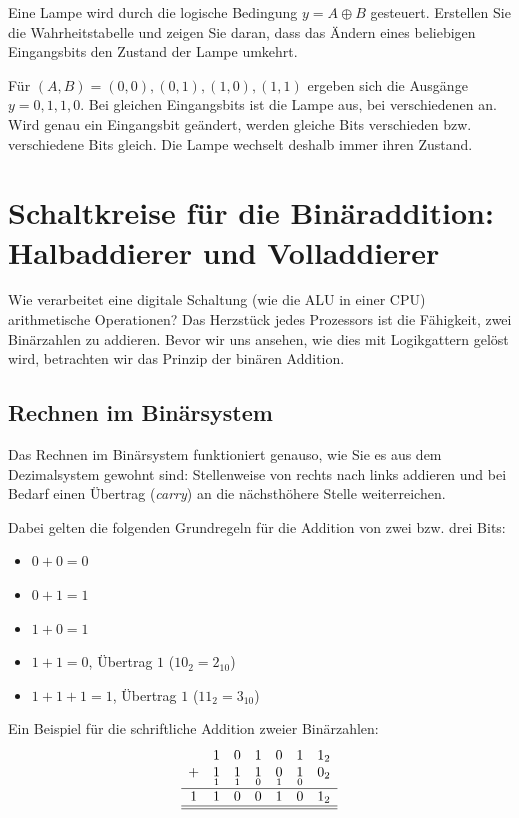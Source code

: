 \begin{myexercise}
    Eine Lampe wird durch die logische Bedingung $y=A\oplus B$ gesteuert. Erstellen Sie die Wahrheitstabelle und zeigen Sie daran, dass das Ändern eines beliebigen Eingangsbits den Zustand der Lampe umkehrt.
    \begin{myanswer}
        Für $(A,B)=(0,0),(0,1),(1,0),(1,1)$ ergeben sich die Ausgänge $y=0,1,1,0$. Bei gleichen Eingangsbits ist die Lampe aus, bei verschiedenen an. Wird genau ein Eingangsbit geändert, werden gleiche Bits verschieden bzw. verschiedene Bits gleich. Die Lampe wechselt deshalb immer ihren Zustand.
    \end{myanswer}
\end{myexercise}

\section{Schaltkreise für die Binäraddition: Halbaddierer und Volladdierer}\label{sec:halbaddierer}

Wie verarbeitet eine digitale Schaltung (wie die \gls{ALU} in einer CPU) arithmetische Operationen? Das Herzstück jedes Prozessors ist die Fähigkeit, zwei Binärzahlen zu addieren. Bevor wir uns ansehen, wie dies mit Logikgattern gelöst wird, betrachten wir das Prinzip der binären Addition.

\subsection{Rechnen im Binärsystem}

Das Rechnen im Binärsystem funktioniert genauso, wie Sie es aus dem Dezimalsystem gewohnt sind: Stellenweise von rechts nach links addieren und bei Bedarf einen Übertrag (\textit{carry}) an die nächsthöhere Stelle weiterreichen.

Dabei gelten die folgenden Grundregeln für die Addition von zwei bzw. drei Bits:
\begin{itemize}
	\item $0 + 0 = 0$
	\item $0 + 1 = 1$
	\item $1 + 0 = 1$
	\item $1 + 1 = 0$, Übertrag $1$ \quad ($10_2 = 2_{10}$)
	\item $1 + 1 + 1 = 1$, Übertrag $1$ \quad ($11_2 = 3_{10}$)
\end{itemize}

Ein Beispiel für die schriftliche Addition zweier Binärzahlen:
\[
	\begin{array}{ccccccc}
		  & 1               & 0               & 1               & 0               & 1               & 1_2              \\
		+ & \underset{1}{1} & \underset{1}{1} & \underset{0}{1} & \underset{1}{0} & \underset{0}{1} & \underset{}{0_2} \\
		\hline
		1 & 1               & 0               & 0               & 1               & 0               & 1_2              \\\hline\hline
	\end{array}
\]

